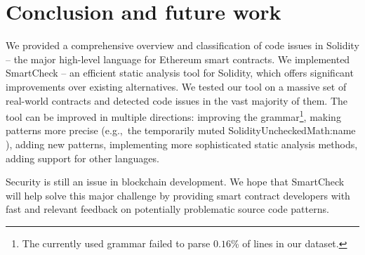 \section{Conclusion and future work}
	
We provided a comprehensive overview and classification of code issues in Solidity -- the major high-level language for Ethereum smart contracts.
We implemented SmartCheck -- an efficient static analysis tool for Solidity, which offers significant improvements over existing alternatives.
We tested our tool on a massive set of real-world contracts and detected code issues in the vast majority of them.
The tool can be improved in multiple directions: improving the grammar\footnote{The currently used grammar failed to parse $0.16$\% of lines in our dataset.}, making patterns more precise (e.g.,~the temporarily muted {\usevalue SolidityUncheckedMath:name }), adding new patterns, implementing more sophisticated static analysis methods, adding support for other languages.

Security is still an issue in blockchain development.
We hope that SmartCheck will help solve this major challenge by providing smart contract developers with fast and relevant feedback on potentially problematic source code patterns.